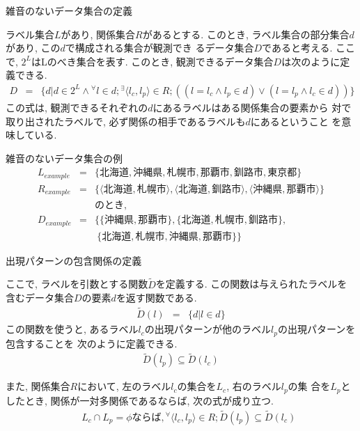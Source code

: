 \begin{df} 雑音のないデータ集合の定義

ラベル集合$L$があり, 関係集合$R$があるとする. 
このとき, ラベル集合の部分集合$d$があり, この$d$で構成される集合が観測でき
るデータ集合$D$であると考える. ここで, $2^L$はLのべき集合を表す. 
このとき, 観測できるデータ集合$D$は次のように定義できる. 
\begin{eqnarray*}
D&=&\{d|d\in 2^L\wedge {}^{\forall} l\in d;
{}^{\exists} \langle l_c,l_p\rangle\in R;
((l=l_c\wedge l_p\in d)\vee (l=l_p\wedge l_c\in d))\}
\end{eqnarray*}
この式は, 観測できるそれぞれの$d$にあるラベルはある関係集合の要素から
対で取り出されたラベルで, 必ず関係の相手であるラベルも$d$にあるということ
を意味している. 
\label{no-noise}
\end{df}
\begin{ex} 雑音のないデータ集合の例
\begin{eqnarray*}
L_{example} &=& \{ 北海道, 沖縄県, 札幌市, 那覇市, 釧路市, 東京都\} \\
R_{example} &=& \{ \langle 北海道, 札幌市\rangle, \langle 北海道, 釧路市\rangle, \langle 沖縄県, 那覇市\rangle \} \\
&& のとき, \\
D_{example} &=& \{\{沖縄県, 那覇市\}, \{北海道, 札幌市, 釧路市\}, \\
&& ~\{北海道, 札幌市, 沖縄県, 那覇市\} \}
\end{eqnarray*}
\end{ex}
\begin{df} 出現パターンの包含関係の定義

ここで, ラベルを引数とする関数$\tilde{D}$を定義する.
この関数は与えられたラベルを含むデータ集合$D$の要素$d$を返す関数である.
\begin{eqnarray*}
 \tilde{D}(l)&=&\{d|l\in d\} 
\end{eqnarray*}
この関数を使うと, 
あるラベル$l_c$の出現パターンが他のラベル$l_p$の出現パターンを包含することを
次のように定義できる. 
\begin{eqnarray*}
\tilde{D}(l_p) \subseteq \tilde{D}(l_c)
\end{eqnarray*}
\end{df}
また, 関係集合$R$において, 左のラベル$l_c$の集合を$L_c$, 右のラベル$l_p$の集
合を$L_p$としたとき, 関係が一対多関係であるならば, 次の式が成り立つ. 
\begin{eqnarray*}
&& L_c \cap L_p = \phi ならば, 
{}^{\forall} \langle l_c,l_p\rangle\in R;\tilde{D}(l_p) \subseteq 
\tilde{D}(l_c)
\end{eqnarray*}
